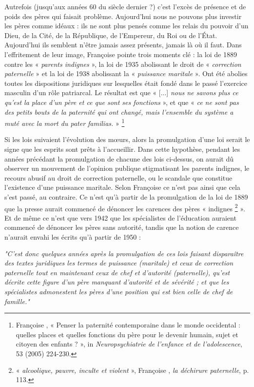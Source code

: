  
Autrefois (jusqu'aux années 60 du siècle dernier ?) c'est l'excès de présence et de poids des pères qui faisait problème. Aujourd'hui nous ne pouvons plus investir les pères comme idéaux : ils ne sont plus pensés comme les relais du pouvoir d'un Dieu, de la Cité, de la République, de l'Empereur, du Roi ou de l'État. Aujourd'hui ils semblent n'être jamais assez présents, jamais là où il faut. Dans l'effritement de leur image, Françoise  pointe trois moments clé : la loi de 1889 contre les « \emph{parents indignes} », la loi de 1935 abolissant le droit de « \emph{correction paternelle} » et la loi de 1938 abolissant la « \emph{puissance maritale} ». Ont été abolies toutes les dispositions juridiques sur lesquelles était fondé dans le passé l'exercice masculin d'un rôle patriarcal. Le résultat est que « [...] \emph{nous ne savons plus ce qu'est la place d'un père et ce que sont ses fonctions} », et que « \emph{ce ne sont pas des petits bouts de la paternité qui ont changé, mais l'ensemble du système a muté avec la mort du \emph{pater familias}.} »%
\footnote{Françoise , « Penser la paternité contemporaine dans le monde occidental : quelles places et quelles fonctions du père pour le devenir humain, sujet et citoyen des enfants ? », in \emph{Neuropsychiatrie de l'enfance et de l'adolescence}, 53 (2005) 224-230.} 


 
  Si les lois suivaient l'évolution des mœurs, alors la promulgation d'une loi serait le signe que les esprits sont prêts à l'accueillir. Dans cette hypothèse, pendant les années précédant la promulgation de chacune des lois ci-dessus, on aurait dû observer un mouvement de l'opinion publique stigmatisant les parents indignes, le recours abusif au droit de correction paternelle, ou le scandale que constitue l'existence d'une puissance maritale. Selon Françoise  ce n'est pas ainsi que cela s'est passé, au contraire. Ce n'est qu'à partir de la promulgation de la loi de 1889 que la presse aurait commencé de dénoncer les carences des pères « indignes%
\footnote{« \emph{alcoolique, pauvre, inculte et violent} », Françoise , \emph{la déchirure paternelle}, p. 113.} 
 ». Et de même ce n'est que vers 1942 que les spécialistes de l'éducation auraient commencé de dénoncer les pères sans autorité, tandis que la notion de carence n'aurait envahi les écrits qu'à partir de 1950 :
 
\begin{displayquote}
\emph{"C'est donc quelques années après la promulgation de ces lois faisant disparaître des textes juridiques les termes de puissance (maritale) et ceux de correction paternelle tout en maintenant ceux de chef et d'autorité (paternelle), qu'est décrite cette figure d'un père manquant d'autorité et de sévérité ; et que les spécialistes admonestent les pères d'une position qui est bien celle de chef de famille."}
\end{displayquote}

